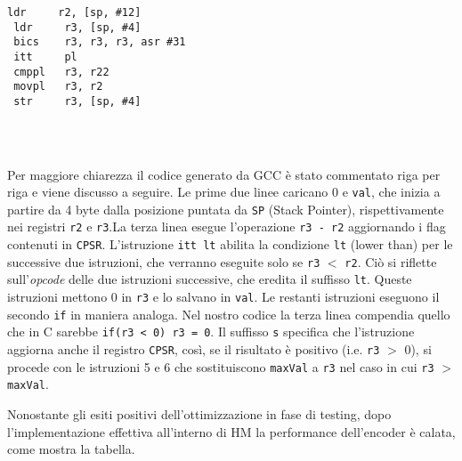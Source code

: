%    

\begin{minipage}{.565\textwidth}
  
\end{minipage}
\hfill
\begin{minipage}{.435\textwidth}
 \begin{lstlisting}[stepnumber=0, frame=ltb]
 ldr     r2, [sp, #12]
 ldr     r3, [sp, #4]
 bics    r3, r3, r3, asr #31
 itt     pl
 cmppl   r3, r22
 movpl   r3, r2
 str     r3, [sp, #4]




 \end{lstlisting}
\end{minipage}
Per maggiore chiarezza il codice generato da GCC è stato commentato riga per 
riga e viene discusso a seguire. \newline
Le prime due linee caricano 0 e \verb|val|, che inizia a partire da 4 byte 
dalla posizione puntata da \verb|SP| (Stack Pointer), rispettivamente nei 
registri \verb|r2| e \verb|r3|.\newline La terza linea esegue l'operazione 
\verb|r3 - r2| aggiornando i flag contenuti in \verb|CPSR|.\newline 
L'istruzione \verb|itt lt| abilita la condizione 
\verb|lt| (lower than) per le successive due istruzioni, che verranno  
eseguite solo se \verb|r3| $<$ \verb|r2|. Ciò si riflette sull'\emph{opcode}
delle due istruzioni successive, che eredita il suffisso \verb|lt|. Queste 
istruzioni mettono 0 in \verb|r3| e lo salvano in \verb|val|. \newline
Le restanti istruzioni eseguono il secondo \verb|if| in maniera analoga.\newline
Nel nostro codice la terza linea compendia quello che in C sarebbe 
\verb|if(r3 < 0) r3 = 0|. Il suffisso \verb|s| specifica che l'istruzione 
aggiorna anche il registro \verb|CPSR|, così, se il risultato è positivo (i.e. 
\verb|r3| $>$ 0), si procede con le istruzioni 5 e 6 che sostituiscono 
\verb|maxVal| a \verb|r3| nel caso in cui \verb|r3| $>$ \verb|maxVal|.
\par Nonostante gli esiti positivi dell'ottimizzazione in fase di testing, dopo 
l'implementazione effettiva all'interno di HM la performance dell'encoder è 
calata, come mostra la tabella.

